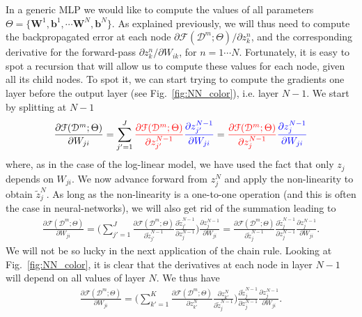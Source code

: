 In a generic MLP we would like to compute the values of all parameters $\Theta=\{\mathbf{W}^1, \mathbf{b}^1, \cdots \mathbf{W}^N, \mathbf{b}^N\}$. As explained previously, we will thus need to compute the backpropagated error at each node $\partial \mathcal{F}(\mathcal{D}^m;\Theta)/\partial z_k^n$, and the corresponding derivative for the forward-pass $\partial z_k^n/\partial W_{ik}$, for $n = 1 \cdots N$. Fortunately, it is easy to spot a recursion that will allow us to compute these values for each node, given all its child nodes. To spot it, we can start trying to compute the gradients one layer before the output layer (see Fig.~\ref{fig:NN_color}), i.e. layer $N-1$. We start by splitting at $N-1$
%
\begin{align}
\frac{\partial \mathcal{F}(\mathcal{D}^m;\Theta)}{\partial W_{ji}} = \sum_{j'=1}^{J} {\color{red} \frac{\partial \mathcal{F}(\mathcal{D}^m;\Theta)}{\partial z_{j'}^{N-1}}} {\color{blue} \frac{\partial z_{j'}^{N-1}}{\partial W_{ji}}} = {\color{red} \frac{\partial \mathcal{F}(\mathcal{D}^m;\Theta)}{\partial z_{j}^{N-1}}} {\color{blue} \frac{\partial z_{j}^{N-1}}{\partial W_{ji}}}
\label{eq:BPderivation1}
\end{align}
%
where, as in the case of the log-linear model, we have used the fact that only $z_j$ depends on $W_{ji}$. We now advance forward from $z^N_j$ and apply the non-linearity to obtain $\tilde{z}^N_j$. As long as the non-linearity is a one-to-one operation (and this is often the case in neural-networks), we will also get rid of the summation leading to
%
\begin{align}
\frac{\partial \mathcal{F}(\mathcal{D}^m;\Theta)}{\partial W_{ji}} = \bigg(\sum_{j'=1}^{J} \frac{\partial \mathcal{F}(\mathcal{D}^m;\Theta)}{\partial \tilde{z}_{j'}^{N-1}} \frac{\partial \tilde{z}_{j'}^{N-1}}{\partial z_{j}^{N-1}}\bigg) \frac{\partial z_{j}^{N-1}}{\partial W_{ji}}= \frac{\partial \mathcal{F}(\mathcal{D}^m;\Theta)}{\partial \tilde{z}_{j}^{N-1}}\frac{\partial \tilde{z}_{j}^{N-1}}{\partial z_{j}^{N-1}}\frac{\partial z_{j}^{N-1}}{\partial W_{ji}}.
\label{eq:BPderivation2}
\end{align}
%
We will not be so lucky in the next application of the chain rule. Looking at Fig.~\ref{fig:NN_color}, it is clear that the derivatives at each node in layer $N-1$ will depend on all values of layer $N$. We thus have
%
\begin{align}
\frac{\partial \mathcal{F}(\mathcal{D}^m;\Theta)}{\partial W_{ji}} = \bigg(\sum_{k'=1}^{K} \frac{\partial \mathcal{F}(\mathcal{D}^m;\Theta)}{\partial z_{k'}^{N}} \frac{\partial z_{k'}^{N}}{\partial \tilde{z}_{j}^{N-1}}\bigg)\frac{\partial \tilde{z}_{j}^{N-1}}{\partial z_{j}^{N-1}}\frac{\partial z_{j}^{N-1}}{\partial W_{ji}}.
\label{eq:BPderivation3}
\end{align}
